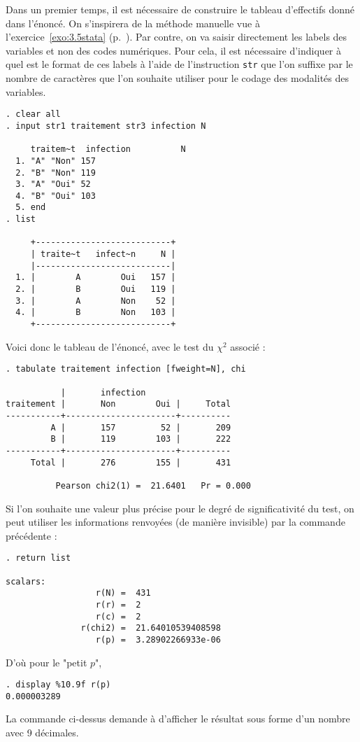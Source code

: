 \soln{\ref{exo:10.4}}
Dans un premier temps, il est nécessaire de construire le tableau
d'effectifs donné dans l'énoncé. On s'inspirera de la méthode manuelle vue à
l'exercice~\ref{exo:3.5stata} (p.~\pageref{exo:3.5stata}). Par contre, on va
saisir directement les labels des variables et non des codes
numériques. Pour cela, il est nécessaire d'indiquer à \Stata quel est le
format de ces labels à l'aide de l'instruction \texttt{str} que l'on suffixe
par le nombre de caractères que l'on souhaite utiliser pour le codage des
modalités des variables.
\begin{verbatim}
. clear all
. input str1 traitement str3 infection N

     traitem~t  infection          N
  1. "A" "Non" 157
  2. "B" "Non" 119
  3. "A" "Oui" 52
  4. "B" "Oui" 103
  5. end
. list

     +---------------------------+
     | traite~t   infect~n     N |
     |---------------------------|
  1. |        A        Oui   157 |
  2. |        B        Oui   119 |
  3. |        A        Non    52 |
  4. |        B        Non   103 |
     +---------------------------+
\end{verbatim}


Voici donc le tableau de l'énoncé, avec le test du $\chi^2$ associé :
\begin{verbatim}
. tabulate traitement infection [fweight=N], chi

           |       infection
traitement |       Non        Oui |     Total
-----------+----------------------+----------
         A |       157         52 |       209 
         B |       119        103 |       222 
-----------+----------------------+----------
     Total |       276        155 |       431 

          Pearson chi2(1) =  21.6401   Pr = 0.000
\end{verbatim}
Si l'on souhaite une valeur plus précise pour le degré de significativité du
test, on peut utiliser les informations renvoyées (de manière invisible) par
la commande précédente :
\begin{verbatim}
. return list

scalars:
                  r(N) =  431
                  r(r) =  2
                  r(c) =  2
               r(chi2) =  21.64010539408598
                  r(p) =  3.28902266933e-06
\end{verbatim}
D'où pour le "petit $p$", 
\begin{verbatim}
. display %10.9f r(p)
0.000003289
\end{verbatim}
La commande ci-dessus demande à \Stata d'afficher le résultat sous forme d'un
nombre avec 9 décimales.

